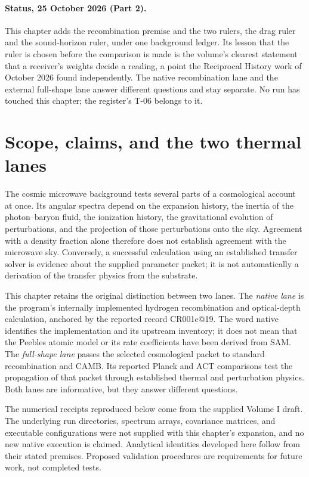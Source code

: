 

\paragraph*{Status, 25 October 2026 (Part 2).} This chapter adds the recombination premise and the two rulers, the drag ruler and the sound-horizon ruler, under one background ledger. Its lesson that the ruler is chosen before the comparison is made is the volume's clearest statement that a receiver's weights decide a reading, a point the Reciprocal History work of October 2026 found independently. The native recombination lane and the external full-shape lane answer different questions and stay separate. No run has touched this chapter; the register's T-06 belongs to it.


\section{Scope, claims, and the two thermal lanes}

The cosmic microwave background tests several parts of a cosmological account at once. Its angular spectra depend on the expansion history, the inertia of the photon--baryon fluid, the ionization history, the gravitational evolution of perturbations, and the projection of those perturbations onto the sky. Agreement with a density fraction alone therefore does not establish agreement with the microwave sky. Conversely, a successful calculation using an established transfer solver is evidence about the supplied parameter packet; it is not automatically a derivation of the transfer physics from the substrate.

This chapter retains the original distinction between two lanes. The \emph{native lane} is the program's internally implemented hydrogen recombination and optical-depth calculation, anchored by the reported record CR001c@19. The word native identifies the implementation and its upstream inventory; it does not mean that the Peebles atomic model or its rate coefficients have been derived from SAM. The \emph{full-shape lane} passes the selected cosmological packet to standard recombination and CAMB. Its reported Planck and ACT comparisons test the propagation of that packet through established thermal and perturbation physics. Both lanes are informative, but they answer different questions.

The numerical receipts reproduced below come from the supplied Volume I draft. The underlying run directories, spectrum arrays, covariance matrices, and executable configurations were not supplied with this chapter's expansion, and no new native execution is claimed. Analytical identities developed here follow from their stated premises. Proposed validation procedures are requirements for future work, not completed tests.

